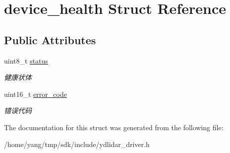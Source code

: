 \hypertarget{structdevice__health}{}\section{device\+\_\+health Struct Reference}
\label{structdevice__health}
\subsection*{Public Attributes}
\begin{DoxyCompactItemize}
\item 
uint8\+\_\+t \hyperlink{structdevice__health_ac3425f5555ecbb5a0da03b4cabe2777c}{status}\hypertarget{structdevice__health_ac3425f5555ecbb5a0da03b4cabe2777c}{}\label{structdevice__health_ac3425f5555ecbb5a0da03b4cabe2777c}

\begin{DoxyCompactList}\small\item\em 健康状体 \end{DoxyCompactList}\item 
uint16\+\_\+t \hyperlink{structdevice__health_a8815828d6de33cb43e8b72da48f51f23}{error\+\_\+code}\hypertarget{structdevice__health_a8815828d6de33cb43e8b72da48f51f23}{}\label{structdevice__health_a8815828d6de33cb43e8b72da48f51f23}

\begin{DoxyCompactList}\small\item\em 错误代码 \end{DoxyCompactList}\end{DoxyCompactItemize}


The documentation for this struct was generated from the following file\+:\begin{DoxyCompactItemize}
\item 
/home/yang/tmp/sdk/include/ydlidar\+\_\+driver.\+h\end{DoxyCompactItemize}

